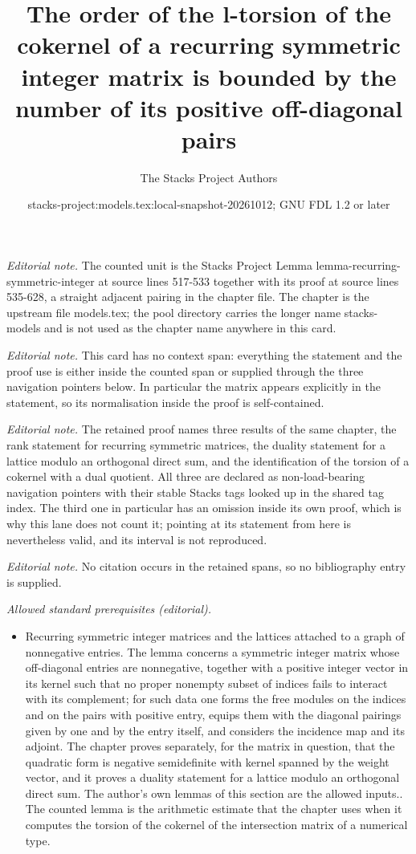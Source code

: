 \documentclass[10pt,a4paper]{amsart}
\title{The order of the l-torsion of the cokernel of a recurring symmetric integer matrix is bounded by the number of its positive off-diagonal pairs}
\author{The Stacks Project Authors}
\date{stacks-project:models.tex:local-snapshot-20261012; GNU FDL 1.2 or later}
\theoremstyle{plain}
\theoremstyle{definition}
\theoremstyle{remark}
\numberwithin{equation}{subsection}
\begin{document}
\maketitle
\noindent\textit{Editorial note.} The counted unit is the Stacks Project Lemma lemma-recurring-symmetric-integer at source lines 517-533 together with its proof at source lines 535-628, a straight adjacent pairing in the chapter file. The chapter is the upstream file models.tex; the pool directory carries the longer name stacks-models and is not used as the chapter name anywhere in this card.\par\medskip
\noindent\textit{Editorial note.} This card has no context span: everything the statement and the proof use is either inside the counted span or supplied through the three navigation pointers below. In particular the matrix appears explicitly in the statement, so its normalisation inside the proof is self-contained.\par\medskip
\noindent\textit{Editorial note.} The retained proof names three results of the same chapter, the rank statement for recurring symmetric matrices, the duality statement for a lattice modulo an orthogonal direct sum, and the identification of the torsion of a cokernel with a dual quotient. All three are declared as non-load-bearing navigation pointers with their stable Stacks tags looked up in the shared tag index. The third one in particular has an omission inside its own proof, which is why this lane does not count it; pointing at its statement from here is nevertheless valid, and its interval is not reproduced.\par\medskip
\noindent\textit{Editorial note.} No citation occurs in the retained spans, so no bibliography entry is supplied.\par\medskip
\noindent\textit{Allowed standard prerequisites (editorial).}\begin{itemize}
\item Recurring symmetric integer matrices and the lattices attached to a graph of nonnegative entries. The lemma concerns a symmetric integer matrix whose off-diagonal entries are nonnegative, together with a positive integer vector in its kernel such that no proper nonempty subset of indices fails to interact with its complement; for such data one forms the free modules on the indices and on the pairs with positive entry, equips them with the diagonal pairings given by one and by the entry itself, and considers the incidence map and its adjoint. The chapter proves separately, for the matrix in question, that the quadratic form is negative semidefinite with kernel spanned by the weight vector, and it proves a duality statement for a lattice modulo an orthogonal direct sum. The author's own lemmas of this section are the allowed inputs.. The counted lemma is the arithmetic estimate that the chapter uses when it computes the torsion of the cokernel of the intersection matrix of a numerical type.
\end{itemize}\medskip
\end{document}
